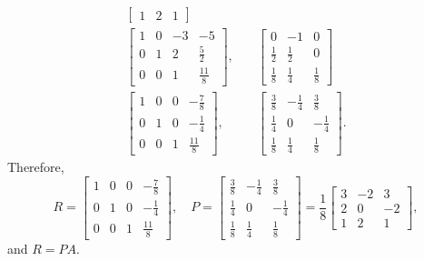 \begin{solution}
\begin{align*}
\begin{bmatrix}
      1 & 2 & 1
    \end{bmatrix} \\
    \begin{bmatrix}
      1 & 0 & -3 & -5 \\[3pt]
      0 & 1 & 2 & \frac52 \\[3pt]
      0 & 0 & 1 & \frac{11}8
    \end{bmatrix},
    &\quad
    \begin{bmatrix}
      0 & -1 & 0 \\[3pt]
      \frac12 & \frac12 & 0 \\[3pt]
      \frac18 & \frac14 & \frac18
    \end{bmatrix} \\
    \begin{bmatrix}
      1 & 0 & 0 & -\frac78 \\[3pt]
      0 & 1 & 0 & -\frac14 \\[3pt]
      0 & 0 & 1 & \frac{11}8
    \end{bmatrix},
    &\quad
    \begin{bmatrix}
      \frac38 & -\frac14 & \frac38 \\[3pt]
      \frac14 & 0 & -\frac14 \\[3pt]
      \frac18 & \frac14 & \frac18
    \end{bmatrix}.
  \end{align*}
  Therefore,
  \begin{equation*}
    R =
    \begin{bmatrix}
      1 & 0 & 0 & -\frac78 \\[3pt]
      0 & 1 & 0 & -\frac14 \\[3pt]
      0 & 0 & 1 & \frac{11}8
    \end{bmatrix},
    \quad
    P =
    \begin{bmatrix}
      \frac38 & -\frac14 & \frac38 \\[3pt]
      \frac14 & 0 & -\frac14 \\[3pt]
      \frac18 & \frac14 & \frac18
    \end{bmatrix}
    =
    \frac18
    \begin{bmatrix}
      3 & -2 & 3 \\
      2 & 0 & -2 \\
      1 & 2 & 1
    \end{bmatrix},
  \end{equation*}
  and $R = PA$.
\end{solution}

